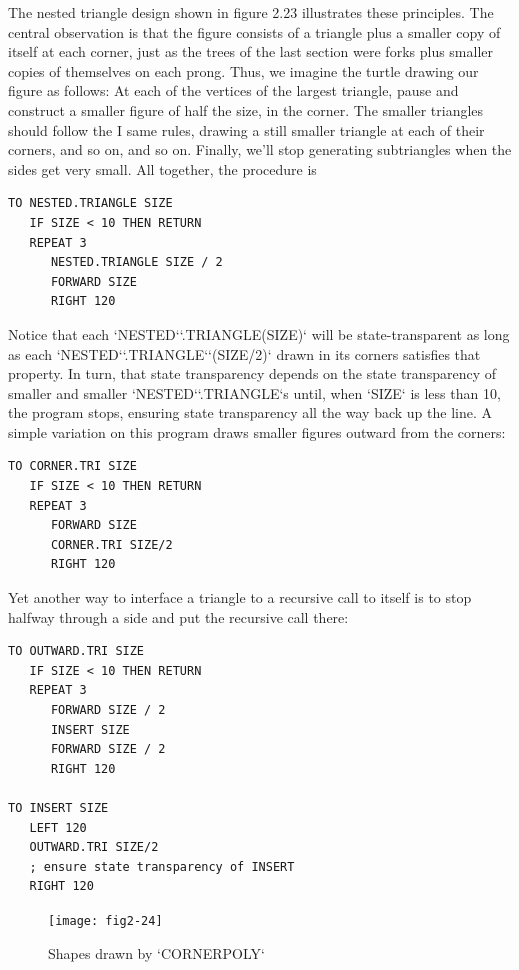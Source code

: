 \documentclass{book}
\begin{document}
The nested triangle design shown in figure 2.23 illustrates these principles. The central observation is that the figure consists of a triangle
plus a smaller copy of itself at each corner, just as the trees of the
last section were forks plus smaller copies of themselves on each prong.
Thus, we imagine the turtle drawing our figure as follows: At each of
the vertices of the largest triangle, pause and construct a smaller figure
of half the size, in the corner. The smaller triangles should follow the
I same rules, drawing a still smaller triangle at each of their corners, and
so on, and so on. Finally, we'll stop generating subtriangles when the
sides get very small. All together, the procedure is

\begin{verbatim}
TO NESTED.TRIANGLE SIZE
   IF SIZE < 10 THEN RETURN
   REPEAT 3
      NESTED.TRIANGLE SIZE / 2
      FORWARD SIZE
      RIGHT 120
\end{verbatim}
Notice that each \textsc{`NESTED`}\textsc{`.TRIANGLE(SIZE)`} will be state-transparent as
long as each \textsc{`NESTED`}\textsc{`.TRIANGLE`}\textsc{`(SIZE/2)`} drawn in its corners satisfies
that property. In turn, that state transparency depends on the state
transparency of smaller and smaller \textsc{`NESTED`}\textsc{`.TRIANGLE`}s until, when \textsc{`SIZE`}
is less than 10, the program stops, ensuring state transparency all the
way back up the line. A simple variation on this program draws smaller
figures outward from the corners:

\begin{verbatim}
TO CORNER.TRI SIZE
   IF SIZE < 10 THEN RETURN
   REPEAT 3
      FORWARD SIZE
      CORNER.TRI SIZE/2
      RIGHT 120
\end{verbatim}
Yet another way to interface a triangle to a recursive call to itself is to
stop halfway through a side and put the recursive call there:

\begin{verbatim}
TO OUTWARD.TRI SIZE
   IF SIZE < 10 THEN RETURN
   REPEAT 3
      FORWARD SIZE / 2
      INSERT SIZE
      FORWARD SIZE / 2
      RIGHT 120

TO INSERT SIZE
   LEFT 120
   OUTWARD.TRI SIZE/2
   ; ensure state transparency of INSERT
   RIGHT 120
\end{verbatim}
\begin{figure}
\begin{center}
\texttt{[image: fig2-24]}
\caption{Shapes drawn by \textsc{`CORNERPOLY`}}
\end{center}
\end{figure}
\end{document}

